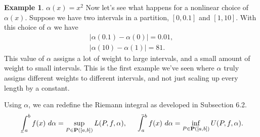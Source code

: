 \documentclass{article}
\def\upint{\mathchoice%
	{\mkern13mu\overline{\vphantom{\intop}\mkern7mu}\mkern-20mu}%
	{\mkern7mu\overline{\vphantom{\intop}\mkern7mu}\mkern-14mu}%
	{\mkern7mu\overline{\vphantom{\intop}\mkern7mu}\mkern-14mu}%
	{\mkern7mu\overline{\vphantom{\intop}\mkern7mu}\mkern-14mu}%
	\int}
\def\lowint{\mkern3mu\underline{\vphantom{\intop}\mkern7mu}\mkern-10mu\int}
\theoremstyle{definition}
\newtheorem{example}{Example}[section]
\begin{document}
	\begin{example}{$ \alpha(x)=x^2 $}
		Now let's see what happens for a nonlinear choice of $ \alpha(x) $. Suppose we have two intervals in a partition, $ [0,0.1] $ and $ [1,10] $. With this choice of $ \alpha $ we have \begin{align*}
			|\alpha(0.1)-\alpha(0)|=0.01,\\
			|\alpha(10)-\alpha(1)|=81.
		\end{align*}
		This value of $ \alpha $ assigns a lot of weight to large intervals, and a small amount of weight to small intervals. This is the first example we've seen where $ \alpha $ truly assigns different weights to different intervals, and not just scaling up every length by a constant. 
	\end{example}
	
	Using $ \alpha $, we can redefine the Riemann integral as developed in Subsection 6.2.
	$$\lowint_a^b f(x)\ d\alpha=\sup\limits_{P\in\textbf{P}([a,b])} L(P,f,\alpha), \ \ \ \ \upint_a^b f(x)\ d\alpha =\inf\limits_{P\in\textbf{P}([a,b])} U(P,f,\alpha). $$
	
\end{document}
